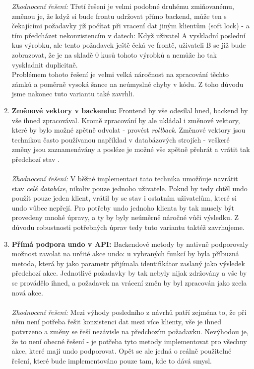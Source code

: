 \begin{enumerate}
	\emph{Zhodnocení řešení:} Třetí řešení je velmi podobné druhému zmiňovanému, změnou je, že když si bude frontu udržovat přímo backend, může ten s čekajícími požadavky již počítat při vracení dat jiným klientům (soft lock) - a tím předcházet nekonzistencím v datech: Když uživatel A vyskladní poslední kus výrobku, ale tento požadavek ještě čeká ve frontě, uživateli B se již bude zobrazovat, že je na skladě 0 kusů tohoto výrobků a nemůže ho tak vyskladnit duplicitně.\\
	Problémem tohoto řešení je velmi velká náročnost na zpracování těchto zámků a poměrně vysoká šance na neúmyslné chyby v kódu. Z toho důvodu jsme nakonec tuto variantu také zavrhli.
	\item \textbf{Změnové vektory v backendu:} Frontend by vše odesílal hned, backend by vše ihned zpracovával. Kromě zpracování by ale ukládal i změnové vektory, které by bylo možné zpětně odvolat - provést \emph{rollback}. Změnové vektory jsou technikou často používanou například v databázových strojích - veškeré změny jsou zaznamenávány a posléze je možné vše zpětně přehrát a vrátit tak předchozí stav \cite{valenta-db}.\\\\
	\emph{Zhodnocení řešení:} V běžné implementaci tato technika umožňuje navrátit stav \emph{celé databáze}, nikoliv pouze jednoho uživatele. Pokud by tedy chtěl undo použít pouze jeden klient, vrátil by se stav i ostatním uživatelům, které si undo vůbec nepřejí. Pro potřeby undo jednoho klienta by tak musely být provedeny mnohé úpravy, a ty by byly neúměrně náročné vůči výsledku. Z důvodu robustnosti potřebných úprav tedy tuto variantu taktéž zavrhujeme.
	\item \textbf{Přímá podpora undo v API:} Backendové metody by nativně podporovaly možnost zavolat na určité akce undo: u vybraných funkcí by byla příbuzná metoda, která by jako parametr přijímala identifikátor zaslaný jako výsledek předchozí akce. Jednotlivé požadavky by tak nebyly nijak zdržovány a vše by se provádělo ihned, a požadavek na vrácení změn by byl zpracován jako zcela nová akce.\\\\
	\emph{Zhodnocení řešení:} Mezi výhody posledního z návrhů patří zejména to, že při něm není potřeba řešit konzistenci dat mezi více klienty, vše je ihned potvrzeno a změny se řeší nezávisle na předchozím požadavku. Nevýhodou je, že to není obecné řešení - je potřeba tyto metody implementovat pro všechny akce, které mají undo podporovat. Opět se ale jedná o reálně použitelné řešení, které bude implementováno pouze tam, kde to dává smysl.
\end{enumerate}


